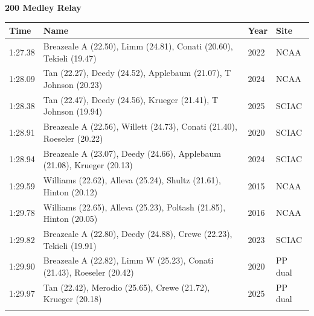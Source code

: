 \noindent\begin{minipage}[t]{0.98\textwidth}
\centering
\textbf{\textcolor{teamprimary}{200 Medley Relay}}\par
\vspace{0.5em}
\centering
\small
\renewcommand{\arraystretch}{1.0}
\setlength{\tabcolsep}{4pt}
\begin{tabular}{@{}p{2.7cm}p{4.3cm}p{1.6cm}p{2.7cm}@{}}
\toprule
\textbf{Time} & \textbf{Name} & \textbf{Year} & \textbf{Site} \\
\midrule
1:27.38 & Breazeale A (22.50), Limm (24.81), Conati (20.60), Tekieli (19.47) & 2022 & NCAA \\
1:28.09 & Tan (22.27), Deedy (24.52), Applebaum (21.07), T Johnson (20.23) & 2024 & NCAA \\
1:28.38 & Tan (22.47), Deedy (24.56), Krueger (21.41), T Johnson (19.94) & 2025 & SCIAC \\
1:28.91 & Breazeale A (22.56), Willett (24.73), Conati (21.40), Roeseler (20.22) & 2020 & SCIAC \\
1:28.94 & Breazeale A (23.07), Deedy (24.66), Applebaum (21.08), Krueger (20.13) & 2024 & SCIAC \\
1:29.59 & Williams (22.62), Alleva (25.24), Shultz (21.61), Hinton (20.12) & 2015 & NCAA \\
1:29.78 & Williams (22.65), Alleva (25.23), Poltash (21.85), Hinton (20.05) & 2016 & NCAA \\
1:29.82 & Breazeale A (22.80), Deedy (24.88), Crewe (22.23), Tekieli (19.91) & 2023 & SCIAC \\
1:29.90 & Breazeale A (22.82), Limm W (25.23), Conati (21.43), Roeseler (20.42) & 2020 & PP dual \\
1:29.97 & Tan (22.42), Merodio (25.65), Crewe (21.72), Krueger (20.18) & 2025 & PP dual \\
\bottomrule
\vspace{0.5em}
\end{tabular}
\end{minipage}
\vspace{1.2em}

